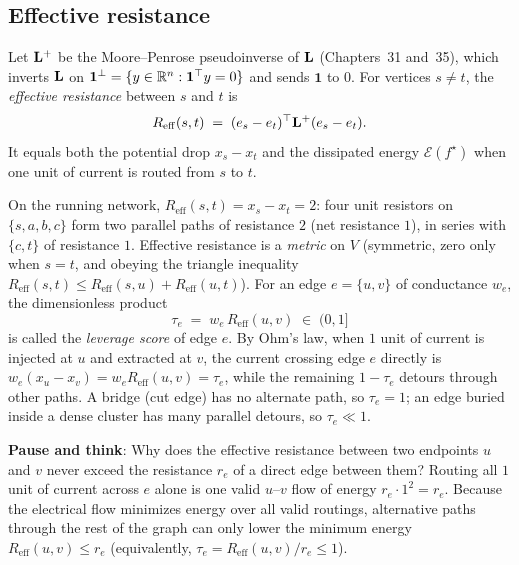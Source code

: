 \subsection{Effective resistance}\label{ch41:reff}

\begin{definition}\label{ch41:def-reff}
Let $\mathbf{L}^{+}$ be the Moore--Penrose pseudoinverse of $\mathbf{L}$ (Chapters~31 and~35), which inverts $\mathbf{L}$ on $\mathbf{1}^\perp = \{y \in \mathbb{R}^n : \mathbf{1}^\top y = 0\}$ and sends $\mathbf{1}$ to $0$. For vertices $s\ne t$, the \emph{effective resistance} between $s$ and $t$ is
\[
  R_{\mathrm{eff}}(s,t) \;=\; (e_s-e_t)^\top \mathbf{L}^{+}(e_s-e_t) .
\]
It equals both the potential drop $x_s - x_t$ and the dissipated energy $\mathcal{E}(f^\star)$ when one unit of current is routed from $s$ to $t$.
\end{definition}

On the running network, $R_{\mathrm{eff}}(s,t)=x_s-x_t=2$: four unit resistors on $\{s,a,b,c\}$ form two parallel paths of resistance $2$ (net resistance $1$), in series with $\{c,t\}$ of resistance $1$. Effective resistance is a \emph{metric} on $V$ (symmetric, zero only when $s=t$, and obeying the triangle inequality $R_{\mathrm{eff}}(s,t) \le R_{\mathrm{eff}}(s,u) + R_{\mathrm{eff}}(u,t)$). For an edge $e=\{u,v\}$ of conductance $w_e$, the dimensionless product
\[
  \tau_e \;=\; w_e\, R_{\mathrm{eff}}(u,v) \;\in\; (0, 1]
\]
is called the \emph{leverage score} of edge $e$. By Ohm's law, when $1$ unit of current is injected at $u$ and extracted at $v$, the current crossing edge $e$ directly is $w_e(x_u - x_v) = w_e R_{\mathrm{eff}}(u,v) = \tau_e$, while the remaining $1 - \tau_e$ detours through other paths. A bridge (cut edge) has no alternate path, so $\tau_e = 1$; an edge buried inside a dense cluster has many parallel detours, so $\tau_e \ll 1$.

\begin{recoverybox}
\textbf{Pause and think}: Why does the effective resistance between two endpoints $u$ and $v$ never exceed the resistance $r_e$ of a direct edge between them? Routing all $1$ unit of current across $e$ alone is one valid $u$--$v$ flow of energy $r_e \cdot 1^2 = r_e$. Because the electrical flow minimizes energy over all valid routings, alternative paths through the rest of the graph can only lower the minimum energy $R_{\mathrm{eff}}(u,v) \le r_e$ (equivalently, $\tau_e = R_{\mathrm{eff}}(u,v)/r_e \le 1$).
\end{recoverybox}


